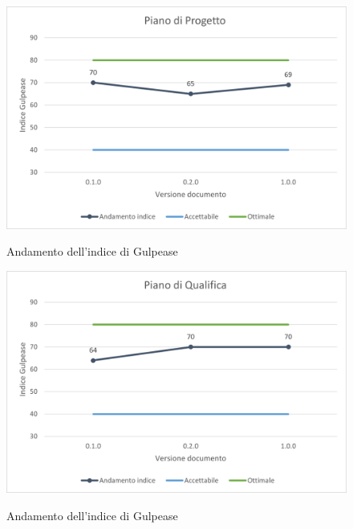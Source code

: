 \begin{figure}[H]
\centering
\includegraphics[scale=0.90]{res/ResocontoAttivitaDiVerifica/res/img/gulpeasePDP.png}\\
\caption{Andamento dell'indice di Gulpease \PdP}
\end{figure}

\begin{figure}[H]
\centering
\includegraphics[scale=0.90]{res/ResocontoAttivitaDiVerifica/res/img/gulpeasePDQ.png}\\
\caption{Andamento dell'indice di Gulpease \PdQ}
\end{figure}

